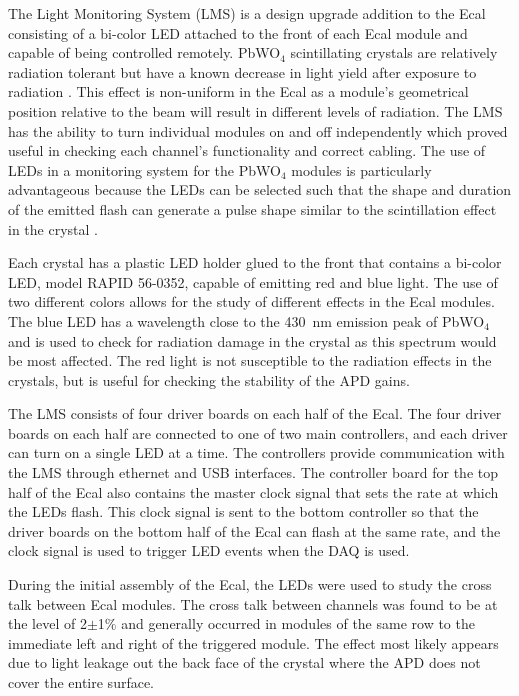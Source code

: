 The Light Monitoring System (LMS) is a design upgrade addition to the Ecal consisting of a bi-color LED attached to the front of each Ecal module and capable of being controlled remotely. PbWO$_4$ scintillating crystals are relatively radiation tolerant but have a known decrease in light yield after exposure to radiation \cite{Batarin}. This effect is non-uniform in the Ecal as a module's geometrical position relative to the beam will result in different levels of radiation. The LMS has the ability to turn individual modules on and off independently which proved useful in checking each channel's functionality and correct cabling. The use of LEDs in a monitoring system for the PbWO$_4$ modules is particularly advantageous because the LEDs can be selected such that the shape and duration of the emitted flash can generate a pulse shape similar to the scintillation effect in the crystal \cite{Battaglieri}.

Each crystal has a plastic LED holder glued to the front that contains a bi-color LED, model RAPID 56-0352, capable of emitting red and blue light. The use of two different colors allows for the study of different effects in the Ecal modules. The blue LED has a wavelength close to the 430~nm emission peak of PbWO$_4$  \cite{Battaglieri} and is used to check for radiation damage in the crystal as this spectrum would be most affected. The red light is not susceptible to the radiation effects in the crystals, but is useful for checking the stability of the  APD gains. 

The LMS consists of four driver boards on each half of the Ecal. The four driver boards on each half are connected to one of two main controllers, and each driver can turn on a single LED at a time. The controllers provide communication with the LMS through ethernet and USB interfaces. The controller board for the top half of the Ecal also contains the master clock signal that sets the rate at which the LEDs flash. This clock signal is sent to the bottom controller so that the driver boards on the bottom half of the Ecal can flash at the same rate, and the clock signal is used to trigger LED events when the DAQ is used. 


During the initial assembly of the Ecal, the LEDs were used to study the cross talk between Ecal modules. The cross talk between channels was found to be at the level of 2$\pm$1$\%$ and generally occurred in modules of the same row to the immediate left and right of the triggered module. The effect most likely appears due to light leakage out the back face of the crystal where the APD does not cover the entire surface.

